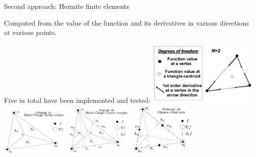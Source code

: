 \documentclass[]{beamer}
\begin{document}
\begin{frame}{Second approach: Hermite finite elements}

Computed from the value of the function and its derivatives in various directions at various points.
	
Five in total have been implemented and tested:
    \hspace*{1.cm}
   		\includegraphics[width=0.4\textwidth]{z9.png}\\
    \hspace*{1.0cm}
   		\includegraphics[width=0.25\textwidth]{hctr.png}
   		\includegraphics[width=0.25\textwidth]{hctc.png}
   		\includegraphics[width=0.25\textwidth]{ganev_dimitrov.png}

\end{frame}
\end{document}

